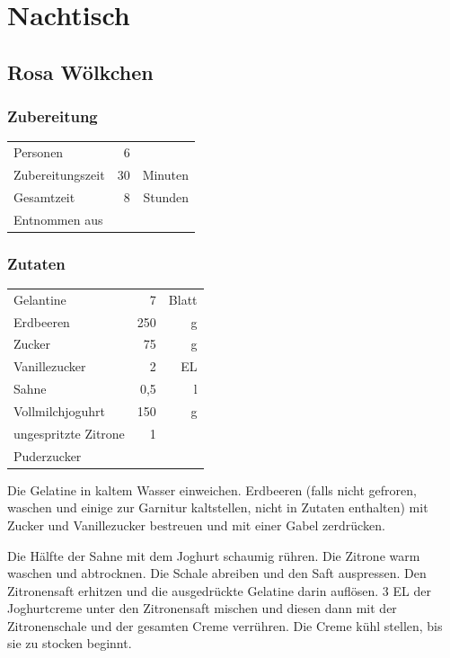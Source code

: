 \chapter{Nachtisch}
\section{Rosa Wölkchen}
\subsection*{Zubereitung}
\begin{tabular}{lrr}
	Personen         &                        6 &  \\
	Zubereitungszeit &                       30 & Minuten \\
	Gesamtzeit       &                        8 & Stunden \\
	Entnommen aus    & \cite{AnnetteWolter1998} &
\end{tabular} 

\subsection*{Zutaten}
\begin{tabular}{lrr}
	Gelantine            &   7 & Blatt \\
	Erdbeeren            & 250 &     g \\
	Zucker               &  75 &     g \\
	Vanillezucker       &   2 &    EL \\
	Sahne                & 0,5 &     l \\
	Vollmilchjoguhrt     & 150 &     g \\
	ungespritzte Zitrone &   1 &  \\
	Puderzucker          &     &
\end{tabular} 

Die Gelatine in kaltem Wasser einweichen. Erdbeeren (falls nicht gefroren, waschen und einige zur Garnitur kaltstellen, nicht in Zutaten enthalten) mit Zucker und Vanillezucker bestreuen und mit einer Gabel zerdrücken.

Die Hälfte der Sahne mit dem Joghurt schaumig rühren. Die Zitrone warm waschen und abtrocknen. Die Schale abreiben und den Saft auspressen. Den Zitronensaft erhitzen und die ausgedrückte Gelatine darin auflösen. 3 EL der Joghurtcreme unter den Zitronensaft mischen und diesen dann mit der Zitronenschale und der gesamten Creme verrühren. Die Creme kühl stellen, bis sie zu stocken beginnt.

